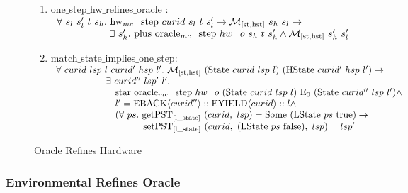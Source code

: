 \begin{figure}

\begin{enumerate}
\item one$\_$step$\_$hw$\_$refines$\_$oracle : \\
$
\begin{array}{l}
\forall \ s_l \ s_l' \ t \ s_h . \ {{{\mathrm{hw}_{mc}\_\mathrm{step}}}~{curid}~{s_l}~{t}~{s_l'}} \rightarrow  {{\mathcal{M}_{[\mathrm{st},\mathrm{hst}]}}~{s_h}~{s_l}} \rightarrow \\
\ \ \ \ \ \ \ \ \ \ \ \ \ \ \ \ \exists\ s_h' . \  {{\mathrm{plus}}~{{{{\mathrm{oracle}_{mc}\_\mathrm{step}}}~{hw\_o}~{s_h}~{t}~{s_h'}}}} \wedge  {{\mathcal{M}_{[\mathrm{st},\mathrm{hst}]}}~{s_h'}~{s_l'}}\\
\end{array}
$
\item match$\_$state$\_$implies$\_$one$\_$step: \\
$
\begin{array}{l}
\forall \ curid \ lsp \ l \ curid' \ hsp \ l' . \ \matchstatehstate{(\mcstate{curid}{lsp}{l})}{(\hstate{curid'}{hsp}{l'})} \rightarrow \\
\ \ \ \ \ \ \ \ \ \ \ \ \ \ \ \  \exists \ curid'' \ lsp' \ l'  . \ \\
\ \ \ \ \ \ \ \ \ \ \ \ \ \ \ \  \ \ \ \ccstarstep{\oraclestep{hw\_o}{(\mcstate{curid}{lsp}{l})}{\ccemptytrace}{(\mcstate{curid''}{lsp}{l'})}} \wedge\\
\ \ \ \ \ \ \ \ \ \ \ \ \ \ \ \  \ \ \ l' = \listcons{\yieldbackev{curid''}}{\listcons{\yieldev{curid}}{l}} \wedge\\
\ \ \ \ \ \ \ \ \ \ \ \ \ \ \ \  \ \ \ (\forall \ ps  . \ \getpstsome{\localstatekwd}{curid}{lsp}{(\localstate{ps}{\btrue})} \rightarrow \\
\ \ \ \ \ \ \ \ \ \ \ \ \ \ \ \  \ \ \ \ \ \ \ \ \ \  \ \ \setpst{\localstatekwd}{curid}{(\localstate{ps}{\bfalse})}{lsp}{lsp'} \\
\end{array}
$
\end{enumerate}

\caption{Oracle Refines Hardware}
\label{fig:oracle-refines-hardware}
\end{figure}

\clearpage


\subsubsection{Environmental Refines Oracle}
\label{subsubsec:env-refines-oracle}

